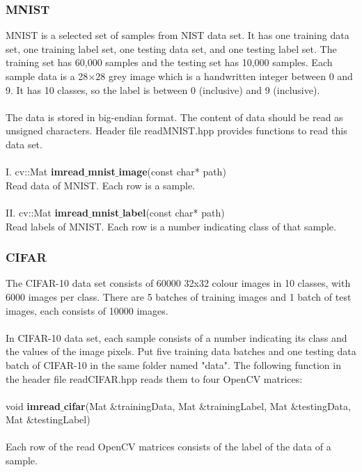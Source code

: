 \documentclass[12pt]{article}
\begin{document}
\subsubsection{MNIST}
MNIST is a selected set of samples from NIST data set. It has one training data set, one training label set, one testing data set, and one testing label set. The training set has 60,000 samples and the testing set has 10,000 samples. Each sample data is a 28$\times$28 grey image which is a handwritten integer between 0 and 9. It has 10 classes, so the label is between 0 (inclusive) and 9 (inclusive).\\
\\
The data is stored in big-endian format. The content of data should be read as unsigned characters. Header file readMNIST.hpp provides functions to read this data set.\\
\\
I. cv::Mat \textbf{imread$\_$mnist$\_$image}(const char* path)\\
Read data of MNIST. Each row is a sample.\\
\\
II. cv::Mat \textbf{imread$\_$mnist$\_$label}(const char* path)\\
Read labels of MNIST. Each row is a number indicating class of that sample.
\subsubsection{CIFAR}
The CIFAR-10 data set consists of 60000 32x32 colour images in 10 classes, with 6000 images per class. There are 5 batches of training images and 1 batch of test images, each consists of 10000 images.\\
\\
In CIFAR-10 data set, each sample consists of a number indicating its class and the values of the image pixels. Put five training data batches and one testing data batch of CIFAR-10 in the same folder named "data". The following function in the header file readCIFAR.hpp reads them to four OpenCV matrices:\\
\\
void \textbf{imread$\_$cifar}(Mat $\&$trainingData, Mat $\&$trainingLabel, Mat $\&$testingData, Mat $\&$testingLabel)\\
\\
Each row of the read OpenCV matrices consists of the label of the data of a sample.
\end{document}

